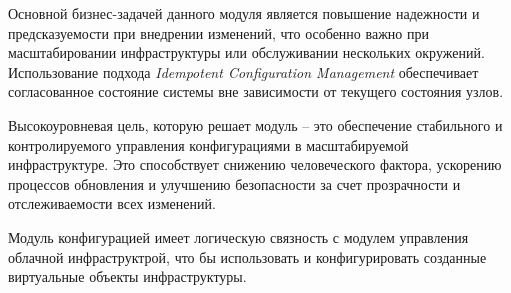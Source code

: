 Основной бизнес-задачей данного модуля является повышение надежности и предсказуемости при внедрении изменений, что особенно важно при масштабировании инфраструктуры или обслуживании нескольких окружений. Использование подхода \textit{Idempotent Configuration Management} обеспечивает согласованное состояние системы вне зависимости от текущего состояния узлов.

Высокоуровневая цель, которую решает модуль -- это обеспечение стабильного и контролируемого управления конфигурациями в масштабируемой инфраструктуре. Это способствует снижению человеческого фактора, ускорению процессов обновления и улучшению безопасности за счет прозрачности и отслеживаемости всех изменений.

Модуль конфигурацией имеет логическую связность с модулем управления облачной инфраструктрой, что бы использовать и конфигурировать созданные виртуальные объекты инфраструктуры.
